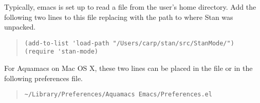 Typically, emacs is set up to read a  file from the
user's home directory.  Add the following two lines to this file
replacing  with the path to where Stan was unpacked.
\begin{quote}
\begin{Verbatim}
(add-to-list 'load-path "/Users/carp/stan/src/StanMode/")
(require 'stan-mode)
\end{Verbatim}
\end{quote}

For Aquamacs on Mac OS X, these two lines can be placed in the
 file or in the following preferences file.
%
\begin{quote}
\nolinkurl{~/Library/Preferences/Aquamacs Emacs/Preferences.el}
\end{quote}





